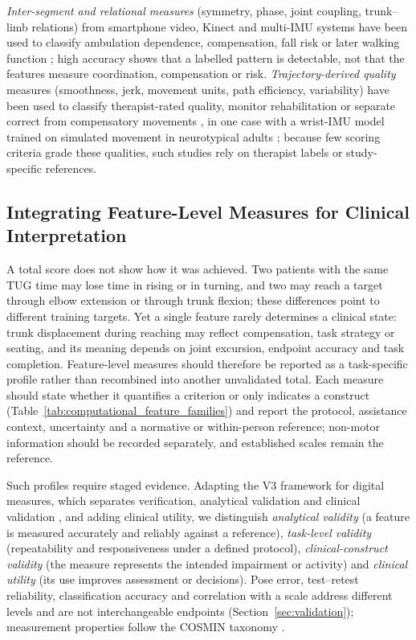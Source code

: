 \documentclass[11pt]{article}
\begin{document}
\emph{Inter-segment and relational measures} (symmetry, phase, joint coupling, trunk--limb relations) from smartphone video, Kinect and multi-IMU systems have been used to classify ambulation dependence, compensation, fall risk or later walking function \cite{Lee2021SmartphoneVideoAmbulation,Zhi2018CompensationDetection,S3Abdollahi202438339529,S3OBrien202236304845}; high accuracy shows that a labelled pattern is detectable, not that the features measure coordination, compensation or risk. \emph{Trajectory-derived quality} measures (smoothness, jerk, movement units, path efficiency, variability) have been used to classify therapist-rated quality, monitor rehabilitation or separate correct from compensatory movements \cite{Jung2017MovementQuality,Lu2021MotionFeaturesProgress,Proffitt2023DepthMovement,Lin2019ManualDexterity,Seo2024WearableQuality}, in one case with a wrist-IMU model trained on simulated movement in neurotypical adults \cite{Li2023DeepLearningTaskPractice}; because few scoring criteria grade these qualities, such studies rely on therapist labels or study-specific references.

\subsection{Integrating Feature-Level Measures for Clinical Interpretation}
A total score does not show how it was achieved. Two patients with the same TUG time may lose time in rising or in turning, and two may reach a target through elbow extension or through trunk flexion; these differences point to different training targets. Yet a single feature rarely determines a clinical state: trunk displacement during reaching may reflect compensation, task strategy or seating, and its meaning depends on joint excursion, endpoint accuracy and task completion. Feature-level measures should therefore be reported as a task-specific profile rather than recombined into another unvalidated total. Each measure should state whether it quantifies a criterion or only indicates a construct (Table~\ref{tab:computational_feature_families}) and report the protocol, assistance context, uncertainty and a normative or within-person reference; non-motor information should be recorded separately, and established scales remain the reference.

Such profiles require staged evidence. Adapting the V3 framework for digital measures, which separates verification, analytical validation and clinical validation \cite{Goldsack2020V3}, and adding clinical utility, we distinguish \emph{analytical validity} (a feature is measured accurately and reliably against a reference), \emph{task-level validity} (repeatability and responsiveness under a defined protocol), \emph{clinical-construct validity} (the measure represents the intended impairment or activity) and \emph{clinical utility} (its use improves assessment or decisions). Pose error, test--retest reliability, classification accuracy and correlation with a scale address different levels and are not interchangeable endpoints (Section~\ref{sec:validation}); measurement properties follow the COSMIN taxonomy \cite{Mokkink2010COSMINTaxonomy}.
\end{document}
